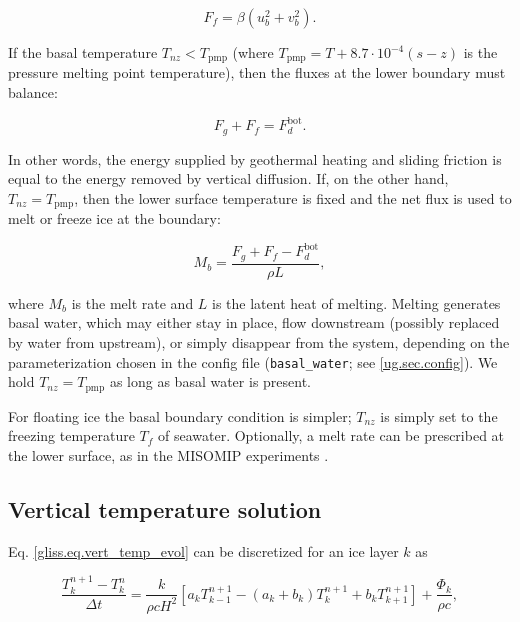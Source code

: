 \begin{equation}
  F_f = \beta (u_b^2 + v_b^2).
\end{equation}

If the basal temperature $T_{nz} < T_{\mathrm{pmp}}$ 
(where $T_{\mathrm{pmp}} = T + 8.7\cdot 10^{-4}(s-z)$ is the pressure melting point temperature),
then the fluxes at the lower boundary must balance:

\begin{equation}
  F_g + F_f = F_{d}^{\mathrm{bot}}.
\end{equation}

\noindent
In other words, the energy supplied by geothermal heating and sliding friction is equal
to the energy removed by vertical diffusion.
If, on the other hand, $T_{nz} = T_{\mathrm{pmp}}$, then the
lower surface temperature is fixed and the net flux is used to melt or freeze ice at the boundary:

\begin{equation}
  \label{gliss.eq.basal_melt}
  M_b = \frac{F_g + F_f - F_d^{\mathrm{bot}}}{\rho L},
\end{equation}
 
\noindent
where $M_b$ is the melt rate and $L$ is the latent heat of melting.
Melting generates basal water, which may either stay in place, flow downstream
(possibly replaced by water from upstream), or simply disappear from the system, 
depending on the parameterization chosen in the config file (\texttt{basal\_water}; see \ref{ug.sec.config}).
We hold $T_{nz} = T_{\mathrm{pmp}}$ as long as basal water is present.

For floating ice the basal boundary condition is simpler; $T_{nz}$ is simply 
set to the freezing temperature $T_f$ of seawater. Optionally, a melt rate can be 
prescribed at the lower surface, as in the MISOMIP experiments \citep{AsayDavis2016}.

\subsection{Vertical temperature solution}

Eq. \eqref{gliss.eq.vert_temp_evol} can be discretized for an ice layer $k$ as

\begin{equation}
  \label{gliss.eq.dTdt1}
  \frac{T_{k}^{n+1}-T_{k}^{n}}{\Delta t} =
  \frac{k}{\rho c H^2}\left[ {{a}_{k}}T_{k-1}^{n+1}-({{a}_{k}}+{{b}_{k}})T_{k}^{n+1}+{{b}_{k}}T_{k+1}^{n+1} \right]+\frac{{{\Phi }_{k}}}{\rho c},
\end{equation}

